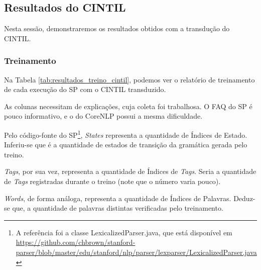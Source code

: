 \subsection{Resultados do CINTIL}
\label{resultados_cintil}
Nesta sessão, demonstraremos os resultados obtidos com a transdução do CINTIL.

\subsubsection{Treinamento} \label{result_treino_cintil}
Na Tabela \ref{tab:resultados_treino_cintil}, podemos ver o relatório de treinamento de cada execução do SP com o CINTIL transduzido.
\begin{center}

\end{center}
As colunas necessitam de explicações, cuja coleta foi trabalhosa. O FAQ do SP é pouco informativo, e o do CoreNLP possui a mesma dificuldade.

Pelo código-fonte do SP\footnote{A referência foi a classe LexicalizedParser.java, que está disponível em \url{https://github.com/chbrown/stanford-parser/blob/master/edu/stanford/nlp/parser/lexparser/LexicalizedParser.java}}, \textit{States} representa a quantidade de Índices de Estado. Inferiu-se que é a quantidade de estados de transição da gramática gerada pelo treino. 

\textit{Tags}, por sua vez, representa a quantidade de Índices de \textit{Tags}. Seria a quantidade de \textit{Tags} registradas durante o treino (note que o número varia pouco).

\textit{Words}, de forma análoga, representa a quantidade de Índices de Palavras. Deduz-se que, a quantidade de palavras distintas verificadas pelo treinamento.

